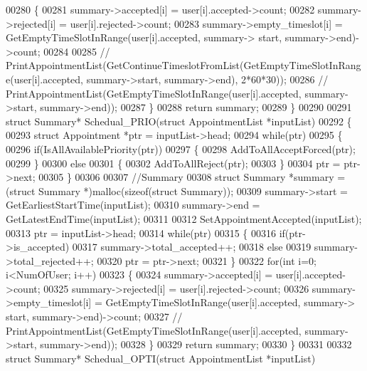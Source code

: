 \begin{DoxyCode}
00280     \{
00281         summary->accepted[i] = user[i].accepted->count;
00282         summary->rejected[i] = user[i].rejected->count;
00283         summary->empty_timeslot[i] = GetEmptyTimeSlotInRange(user[i].accepted, summary->
      start, summary->end)->count;
00284 
00285         \textcolor{comment}{// PrintAppointmentList(GetContinueTimeslotFromList(GetEmptyTimeSlotInRange(user[i].accepted,
       summary->start, summary->end), 2*60*30));}
00286         \textcolor{comment}{// PrintAppointmentList(GetEmptyTimeSlotInRange(user[i].accepted, summary->start, summary->end));}
00287     \}
00288     \textcolor{keywordflow}{return} summary;
00289 \}
00290 
00291 \textcolor{keyword}{struct }Summary* Schedual_PRIO(\textcolor{keyword}{struct} AppointmentList *inputList)
00292 \{
00293     \textcolor{keyword}{struct }Appointment *ptr = inputList->head;
00294     \textcolor{keywordflow}{while}(ptr)
00295     \{
00296         \textcolor{keywordflow}{if}(IsAllAvailablePriority(ptr))
00297         \{
00298             AddToAllAcceptForced(ptr);
00299         \}
00300         \textcolor{keywordflow}{else}
00301         \{
00302             AddToAllReject(ptr);
00303         \}
00304         ptr = ptr->next;
00305     \}
00306 
00307     \textcolor{comment}{//Summary}
00308     \textcolor{keyword}{struct }Summary *summary = (\textcolor{keyword}{struct }Summary *)malloc(\textcolor{keyword}{sizeof}(\textcolor{keyword}{struct} Summary));
00309     summary->start = GetEarliestStartTime(inputList);
00310     summary->end = GetLatestEndTime(inputList);
00311     
00312     SetAppointmentAccepted(inputList);
00313     ptr = inputList->head;
00314     \textcolor{keywordflow}{while}(ptr)
00315     \{
00316         \textcolor{keywordflow}{if}(ptr->is_accepted)
00317             summary->total_accepted++;
00318         \textcolor{keywordflow}{else}
00319             summary->total_rejected++;
00320         ptr = ptr->next;
00321     \}
00322     \textcolor{keywordflow}{for}(\textcolor{keywordtype}{int} i=0; i<NumOfUser; i++)
00323     \{
00324         summary->accepted[i] = user[i].accepted->count;
00325         summary->rejected[i] = user[i].rejected->count;
00326         summary->empty_timeslot[i] = GetEmptyTimeSlotInRange(user[i].accepted, summary->
      start, summary->end)->count;
00327         \textcolor{comment}{// PrintAppointmentList(GetEmptyTimeSlotInRange(user[i].accepted, summary->start, summary->end));}
00328     \}
00329     \textcolor{keywordflow}{return} summary;
00330 \}
00331 
00332 \textcolor{keyword}{struct }Summary* Schedual_OPTI(\textcolor{keyword}{struct} AppointmentList *inputList)

\end{DoxyCode}
